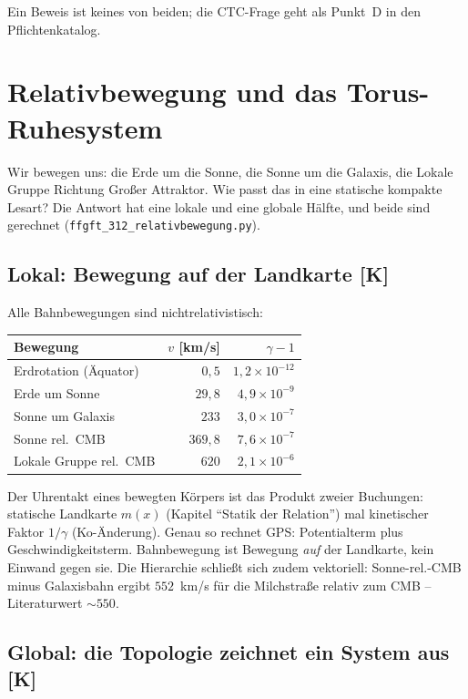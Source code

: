 Ein Beweis ist keines von beiden; die CTC-Frage geht als Punkt~D in
den Pflichtenkatalog.

\chapter{Relativbewegung und das Torus-Ruhesystem}

Wir bewegen uns: die Erde um die Sonne, die Sonne um die Galaxis,
die Lokale Gruppe Richtung Großer Attraktor. Wie passt das in eine
statische kompakte Lesart? Die Antwort hat eine lokale und eine
globale Hälfte, und beide sind gerechnet
(\texttt{ffgft\_312\_relativbewegung.py}).

\section{Lokal: Bewegung auf der Landkarte [K]}

Alle Bahnbewegungen sind nichtrelativistisch:

\begin{center}
\begin{tabular}{lrr}
\toprule
Bewegung & $v$ [km/s] & $\gamma-1$ \\
\midrule
Erdrotation (Äquator) & $0{,}5$ & $1{,}2\times10^{-12}$ \\
Erde um Sonne & $29{,}8$ & $4{,}9\times10^{-9}$ \\
Sonne um Galaxis & $233$ & $3{,}0\times10^{-7}$ \\
Sonne rel.\ CMB & $369{,}8$ & $7{,}6\times10^{-7}$ \\
Lokale Gruppe rel.\ CMB & $620$ & $2{,}1\times10^{-6}$ \\
\bottomrule
\end{tabular}
\end{center}

Der Uhrentakt eines bewegten Körpers ist das Produkt zweier
Buchungen: statische Landkarte $m(x)$ (Kapitel \enquote{Statik der
Relation}) mal kinetischer Faktor $1/\gamma$ (Ko-Änderung). Genau so
rechnet GPS: Potentialterm plus Geschwindigkeitsterm. Bahnbewegung
ist Bewegung \emph{auf} der Landkarte, kein Einwand gegen sie. Die
Hierarchie schließt sich zudem vektoriell: Sonne-rel.-CMB minus
Galaxisbahn ergibt $552$~km/s für die Milchstraße relativ zum CMB
-- Literaturwert $\sim550$.

\section{Global: die Topologie zeichnet ein System aus [K]}

